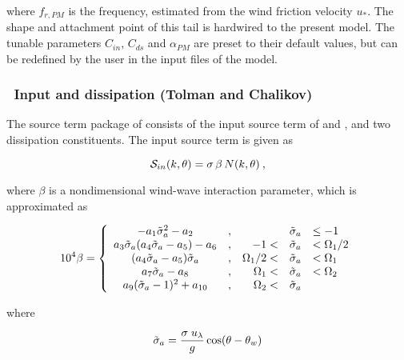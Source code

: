 \noindent
where $f_{r,PM}$ is the \cite{art:PM64} frequency, estimated from the wind
friction velocity $u_\ast$. The shape and attachment point of this tail is
hardwired to the present model. The tunable parameters $C_{in}$, $C_{ds}$ and
$\alpha_{PM}$ are preset to their default values, but can be redefined by the
user in the input files of the model.


\vsssub
\subsubsection{~Input and dissipation (Tolman and Chalikov)}
\label{sec:t&c} \vsssub

The source term package of \cite{tol:JPO96} consists of the input source term
of \cite{art:CB93} and \cite{art:Cha95}, and two dissipation constituents. The
input source term is given as


\begin{equation}
{\cal S}_{in}(k,\theta) = \sigma \, \beta \, N(k,\theta)
\: , \label{eq:CB93_gen} \end{equation}

\noindent
where $\beta$ is a nondimensional wind-wave interaction parameter, which is
approximated as


\begin{equation}
10^4 \beta = \left \{
\begin{array}{ccrcl}
-a_1\tilde{\sigma}_a^2 -a_2          &,&             & \tilde{\sigma}_a & \leq -1     \\
a_3\tilde{\sigma}_a(a_4\tilde{\sigma}_a-a_5)-a_6 &,&         -1< & \tilde{\sigma}_a & <\Omega_1/2 \\
(a_4\tilde{\sigma}_a-a_5)\tilde{\sigma}_a        &,& \Omega_1/2< & \tilde{\sigma}_a & <\Omega_1   \\
a_7\tilde{\sigma}_a-a_8              &,&   \Omega_1< & \tilde{\sigma}_a & <\Omega_2   \\
a_9(\tilde{\sigma}_a-1)^2+a_{10}     &,&   \Omega_2< & \tilde{\sigma}_a &
\end{array} \right . \label{eq:CB93_beta}
\end{equation}

\noindent
where


\begin{equation}
\tilde{\sigma}_a= \frac{\sigma \; u_{\lambda}}{g} \cos(\theta-\theta_w)
\label{eq:CB93_oma} \end{equation}

